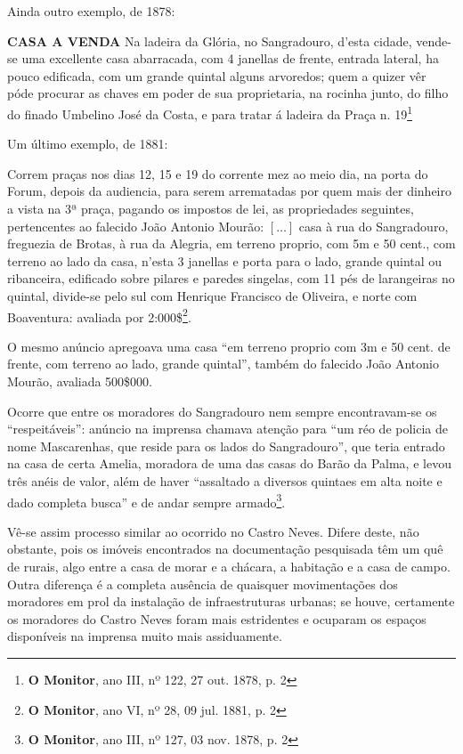 Ainda outro exemplo, de 1878:

\begin{citacao}
\textbf{CASA A VENDA}
Na ladeira da Glória, no Sangradouro, d'esta cidade, vende-se uma excellente casa abarracada, com 4 janellas de frente, entrada lateral, ha pouco edificada, com um grande quintal alguns arvoredos; quem a quizer vêr póde procurar as chaves em poder de sua proprietaria, na rocinha junto, do filho do finado Umbelino José da Costa, e para tratar á ladeira da Praça n. 19\footnote{\textbf{O Monitor}, ano III, nº 122, 27 out. 1878, p. 2}
\end{citacao}

Um último exemplo, de 1881:

\begin{citacao}
Correm praças nos dias 12, 15 e 19 do corrente mez ao meio dia, na porta do Forum, depois da audiencia, para serem arrematadas por quem mais der dinheiro a vista na 3ª praça, pagando os impostos de lei, as propriedades seguintes, pertencentes ao falecido João Antonio Mourão: \([\dots]\) casa à rua do Sangradouro, freguezia de Brotas, à rua da Alegria, em terreno proprio, com 5m e 50 cent., com terreno ao lado da casa, n'esta 3 janellas e porta para o lado, grande quintal ou ribanceira, edificado sobre pilares e paredes singelas, com 11 pés de larangeiras no quintal, divide-se pelo sul com Henrique Francisco de Oliveira, e norte com Boaventura: avaliada por 2:000\$\footnote{\textbf{O Monitor}, ano VI, nº 28, 09 jul. 1881, p. 2}.
\end{citacao}

O mesmo anúncio apregoava uma casa ``em terreno proprio com 3m e 50 cent. de frente, com terreno ao lado, grande quintal'', também do falecido João Antonio Mourão, avaliada 500\$000.

Ocorre que entre os moradores do Sangradouro nem sempre encontravam-se os ``respeitáveis'': anúncio na imprensa chamava atenção para ``um réo de policia de nome Mascarenhas, que reside para os lados do Sangradouro'', que teria entrado na casa de certa Amelia, moradora de uma das casas do Barão da Palma, e levou três anéis de valor, além de haver ``assaltado a diversos quintaes em alta noite e dado completa busca'' e de andar sempre armado\footnote{\textbf{O Monitor}, ano III, nº 127, 03 nov. 1878, p. 2}.

Vê-se assim processo similar ao ocorrido no Castro Neves. Difere deste, não obstante, pois os imóveis encontrados na documentação pesquisada têm um quê de rurais, algo entre a casa de morar e a chácara, a habitação e a casa de campo. Outra diferença é a completa ausência de quaisquer movimentações dos moradores em prol da instalação de infraestruturas urbanas; se houve, certamente os moradores do Castro Neves foram mais estridentes e ocuparam os espaços disponíveis na imprensa muito mais assiduamente. 

